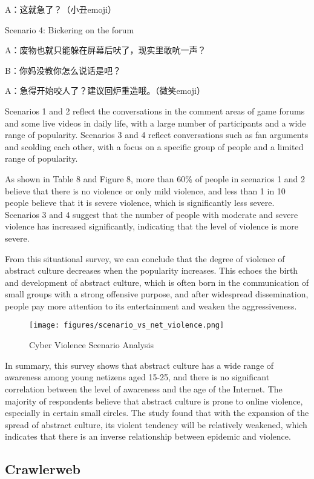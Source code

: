 \documentclass[12pt,a4paper]{ctexart}
\begin{document}
A：这就急了？（小丑emoji）

Scenario 4: Bickering on the forum

A：废物也就只能躲在屏幕后吠了，现实里敢吭一声？

B：你妈没教你怎么说话是吧？

A：急得开始咬人了？建议回炉重造哦。（微笑emoji）

Scenarios 1 and 2 reflect the conversations in the comment areas of game forums and some live videos in daily life, with a large number of participants and a wide range of popularity. Scenarios 3 and 4 reflect conversations such as fan arguments and scolding each other, with a focus on a specific group of people and a limited range of popularity.

As shown in Table 8 and Figure 8, more than 60\% of people in scenarios 1 and 2 believe that there is no violence or only mild violence, and less than 1 in 10 people believe that it is severe violence, which is significantly less severe. Scenarios 3 and 4 suggest that the number of people with moderate and severe violence has increased significantly, indicating that the level of violence is more severe.

From this situational survey, we can conclude that the degree of violence of abstract culture decreases when the popularity increases. This echoes the birth and development of abstract culture, which is often born in the communication of small groups with a strong offensive purpose, and after widespread dissemination, people pay more attention to its entertainment and weaken the aggressiveness.

\begin{figure}[htbp]
    \centering
    \texttt{[image: figures/scenario\_vs\_net\_violence.png]}
    \caption{Cyber Violence Scenario Analysis}
    \label{fig:scenario_vs_net_violence}
\end{figure}

In summary, this survey shows that abstract culture has a wide range of awareness among young netizens aged 15-25, and there is no significant correlation between the level of awareness and the age of the Internet. The majority of respondents believe that abstract culture is prone to online violence, especially in certain small circles. The study found that with the expansion of the spread of abstract culture, its violent tendency will be relatively weakened, which indicates that there is an inverse relationship between epidemic and violence.

\subsection{Crawlerweb}
\end{document}
